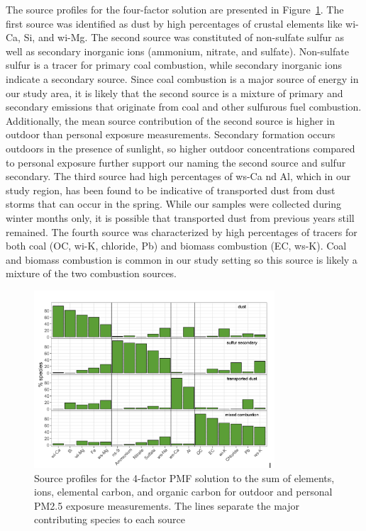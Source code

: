 \documentclass[
  letterpaper,
  DIV=11,
  numbers=noendperiod]{scrartcl}
\begin{document}
The source profiles for the four-factor solution are presented in
Figure~\ref{fig-source-figure}. The first source was identified as dust
by high percentages of crustal elements like wi-Ca, Si, and wi-Mg. The
second source was constituted of non-sulfate sulfur as well as secondary
inorganic ions (ammonium, nitrate, and sulfate). Non-sulfate sulfur is a
tracer for primary coal combustion, while secondary inorganic ions
indicate a secondary source. Since coal combustion is a major source of
energy in our study area, it is likely that the second source is a
mixture of primary and secondary emissions that originate from coal and
other sulfurous fuel combustion. Additionally, the mean source
contribution of the second source is higher in outdoor than personal
exposure measurements. Secondary formation occurs outdoors in the
presence of sunlight, so higher outdoor concentrations compared to
personal exposure further support our naming the second source and
sulfur secondary. The third source had high percentages of ws-Ca nd Al,
which in our study region, has been found to be indicative of
transported dust from dust storms that can occur in the spring. While
our samples were collected during winter months only, it is possible
that transported dust from previous years still remained. The fourth
source was characterized by high percentages of tracers for both coal
(OC, wi-K, chloride, Pb) and biomass combustion (EC, ws-K). Coal and
biomass combustion is common in our study setting so this source is
likely a mixture of the two combustion sources.

\begin{figure}[H]

{\centering \includegraphics[width=0.8\textwidth,height=\textheight]{images/source-figure.png}

}

\caption{\label{fig-source-figure}Source profiles for the 4-factor PMF
solution to the sum of elements, ions, elemental carbon, and organic
carbon for outdoor and personal PM2.5 exposure measurements. The lines
separate the major contributing species to each source}

\end{figure}
\end{document}
